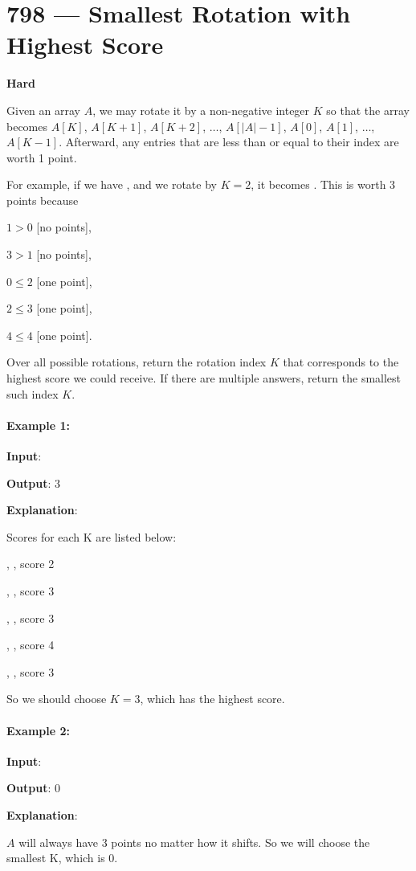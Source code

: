 \section{798 --- Smallest Rotation with Highest Score}

\textbf{Hard}

Given an array $A$, we may rotate it by a non-negative integer $K$ so that the array becomes $ A[K] $, $ A[K+1] $, $ A[K+2] $, $\ldots$, $ A[\lvert A\rvert - 1] $, $ A[0] $, $ A[1] $, $\ldots$, $ A[K-1] $.  Afterward, any entries that are less than or equal to their index are worth 1 point. 

For example, if we have \fcj{[2, 4, 1, 3, 0]}, and we rotate by $ K = 2 $, it becomes \fcj{[1, 3, 0, 2, 4]}.  This is worth 3 points because 

$ 1 > 0 $ [no points], 

$ 3 > 1 $ [no points], 

$ 0 \leq 2 $ [one point], 

$ 2 \leq 3 $ [one point], 

$ 4 \leq 4 $ [one point].

Over all possible rotations, return the rotation index $ K $ that corresponds to the highest score we could receive.  If there are multiple answers, return the smallest such index $ K $.
\paragraph{Example 1:}

\begin{flushleft}
\textbf{Input}: \fcj{[2, 3, 1, 4, 0]}

\textbf{Output}: 3

\textbf{Explanation}:  

Scores for each K are listed below: 

,  , score 2

,  , score 3

,  , score 3

,  , score 4

,  , score 3

So we should choose $ K = 3 $, which has the highest score.


\end{flushleft}
 

\paragraph{Example 2:}
\begin{flushleft}

\textbf{Input}: \fcj{[1, 3, 0, 2, 4]}

\textbf{Output}: 0

\textbf{Explanation}:  

$A$ will always have 3 points no matter how it shifts. So we will choose the smallest K, which is 0.


\end{flushleft}


